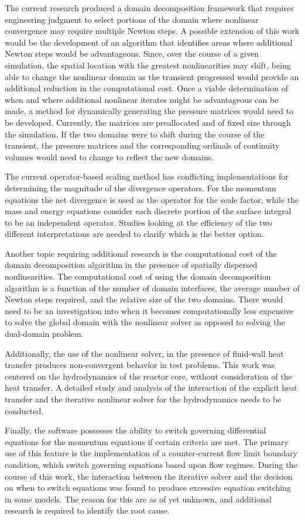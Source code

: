 The current research produced a domain decomposition framework that requires engineering judgment to select portions of the domain where nonlinear convergence may require multiple Newton steps.
A possible extension of this work would be the development of an algorithm that identifies areas where additional Newton steps would be advantageous.
Since, over the course of a given simulation, the spatial location with the greatest nonlinearities may shift, being able to change the nonlinear domain as the transient progressed would provide an additional reduction in the computational cost.
Once a viable determination of when and where additional nonlinear iterates might be advantageous can be made, a method for dynamically generating the pressure matrices would need to be developed.
Currently, the matrices are preallocated and of fixed size through the simulation.
If the two domains were to shift during the course of the transient, the pressure matrices and the corresponding ordinals of continuity volumes would need to change to reflect the new domains.

The current operator-based scaling method has conflicting implementations for determining the magnitude of the divergence operators.
For the momentum equations the net divergence is used as the operator for the scale factor, while the mass and energy equations consider each discrete portion of the surface integral to be an independent operator.
Studies looking at the efficiency of the two different interpretations are needed to clarify which is the better option.

Another topic requiring additional research is the computational cost of the domain decomposition algorithm in the presence of spatially dispersed nonlinearities. 
The computational cost of using the domain decomposition algorithm is a function of the number of domain interfaces, the average number of Newton steps required, and the relative size of the two domains.
There would need to be an investigation into when it becomes computationally less expensive to solve the global domain with the nonlinear solver as opposed to solving the dual-domain problem.

Additionally, the use of the nonlinear solver, in the presence of fluid-wall heat transfer produces non-convergent behavior in test problems.
This work was centered on the hydrodynamics of the reactor core, without consideration of the heat transfer.
A detailed study and analysis of the interaction of the explicit heat transfer and the iterative nonlinear solver for the hydrodynamics needs to be conducted.

Finally, the \cobra{} software possesses the ability to switch governing differential equations for the momentum equations if certain criteria are met.
The primary use of this feature is the implementation of a counter-current flow limit boundary condition, which switch governing equations based upon flow regimes.
During the course of this work, the interaction between the iterative solver and the decision on when to switch equations was found to produce excessive equation switching in some models.
The reason for this are as of yet unknown, and additional research is required to identify the root cause.